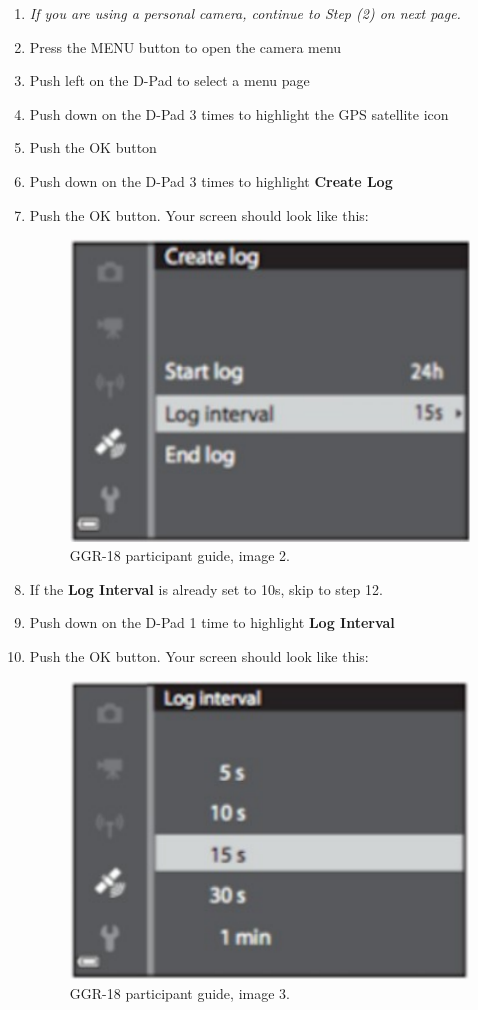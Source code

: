 \begin{enumerate}
    \item \textit{If you are using a personal camera, continue to Step (2) on next page.}
    \item Press the MENU button to open the camera menu
    \item Push left on the D-Pad to select a menu page
    \item Push down on the D-Pad 3 times to highlight the GPS satellite icon
    \item Push the OK button
    \item Push down on the D-Pad 3 times to highlight \textbf{Create Log}
    \item Push the OK button.  Your screen should look like this:

          \begin{figure}[H]
              \begin{center}
                  \includegraphics[width=0.4\linewidth]{resources/guide3.pdf}
              \end{center}
              \caption{GGR-18 participant guide, image 2.}
          \end{figure}

    \item If the \textbf{Log Interval} is already set to 10s, skip to step 12.
    \item Push down on the D-Pad 1 time to highlight \textbf{Log Interval}
    \item Push the OK button. Your screen should look like this:

          \begin{figure}[H]
              \begin{center}
                  \includegraphics[width=0.4\linewidth]{resources/guide2.pdf}
              \end{center}
              \caption{GGR-18 participant guide, image 3.}
          \end{figure}


\end{enumerate}
